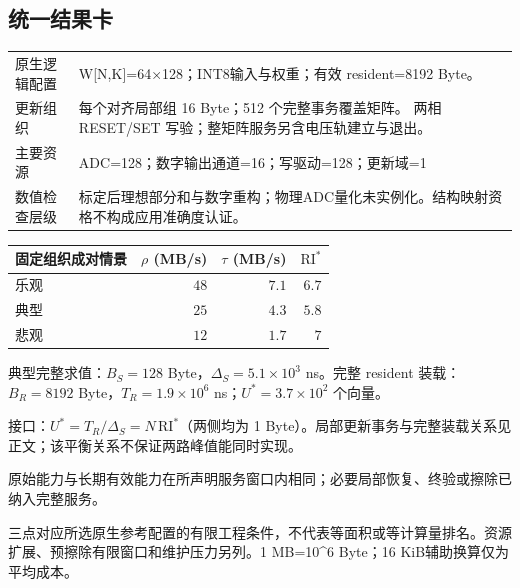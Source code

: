 \subsection*{统一结果卡}
\begingroup\small
\noindent\begin{tabularx}{\textwidth}{@{}p{24mm}X@{}}\toprule
原生逻辑配置 & W[N,K]=64×128；INT8输入与权重；有效 resident=8192 Byte。\\
更新组织 & 每个对齐局部组 16 Byte；512 个完整事务覆盖矩阵。 两相 RESET/SET 写验；整矩阵服务另含电压轨建立与退出。\\
主要资源 & ADC=128；数字输出通道=16；写驱动=128；更新域=1\\
数值检查层级 & 标定后理想部分和与数字重构；物理ADC量化未实例化。结构映射资格不构成应用准确度认证。\\
\bottomrule\end{tabularx}
\vspace{3mm}
\begin{center}\begin{tabular}{@{}lrrr@{}}\toprule
固定组织成对情景 & $\rho$ (MB/s) & $\tau$ (MB/s) & $\mathrm{RI}^{*}$\\\midrule
乐观 & $48$ & $7.1$ & $6.7$\\
典型 & $25$ & $4.3$ & $5.8$\\
悲观 & $12$ & $1.7$ & $7$\\
\bottomrule\end{tabular}\end{center}
\noindent 典型完整求值：$B_S=128$ Byte，$\Delta_S=5.1\times10^{3}$ ns。完整 resident 装载：$B_R=8192$ Byte，$T_R=1.9\times10^{6}$ ns；$U^*=3.7\times10^{2}$ 个向量。
\par\smallskip\noindent 接口：$U^*=T_R/\Delta_S=N\,\mathrm{RI}^*$（两侧均为 1 Byte）。局部更新事务与完整装载关系见正文；该平衡关系不保证两路峰值能同时实现。
\par\smallskip\noindent 原始能力与长期有效能力在所声明服务窗口内相同；必要局部恢复、终验或擦除已纳入完整服务。
\par\smallskip\noindent 三点对应所选原生参考配置的有限工程条件，不代表等面积或等计算量排名。资源扩展、预擦除有限窗口和维护压力另列。1 MB=10\textasciicircum{}6 Byte；16 KiB辅助换算仅为平均成本。
\endgroup
\clearpage
